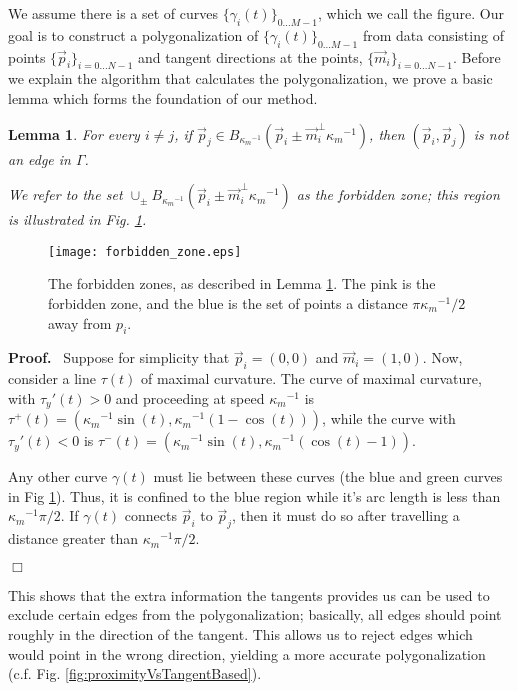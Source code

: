 \documentclass{article}
\newenvironment{proof}{
  \noindent\textbf{Proof.}\ }{\hspace*{\fill}
  \begin{math}\Box\end{math}\medskip}
\newtheorem{lemma}[cntr]{Lemma}
\numberwithin{cntr}{section}
\numberwithin{equation}{section}
\newcommand{\vp}[0]{{\vec{p}}}
\newcommand{\vm}[0]{{\vec{m}}}
\newcommand{\Oto}[1]{{0 \ldots #1-1}}
\newcommand{\OtoN}{{0 \ldots N-1}}
\newcommand{\pointData}{{ \{ \vp_{i} \}_{i=\OtoN} }}
\newcommand{\tanData}{{ \{ \vm_{i} \}_{i=\OtoN} }}
\newcommand{\curveSet}{{ \{ \gamma_i(t) \}_{\Oto{M}}}}
\newcommand{\poly}{{\Gamma}}
\newcommand{\ball}[2]{ { B_{#1}(#2) } }
\newcommand{\kmax}{{\kappa_{m}}}
\newcommand{\kmaxi}{{\kmax^{-1}}}
\begin{document}
We assume there is a set of curves $\curveSet$, which we call the figure. Our goal is to construct a polygonalization of $\curveSet$ from data consisting of points $\pointData$ and tangent directions at the points, $\tanData$. Before we explain the algorithm that calculates the polygonalization, we prove a basic lemma which forms the foundation of our method.
\begin{lemma}
  \label{lem:forbiddenZone}
  For every $i \neq j$, if $\vp_{j} \in \ball{\kmaxi}{\vp_{i} \pm \vm_{i}^{\perp} \kmaxi}$, then $(\vp_{i},\vp_{j})$ is not an edge in $\poly$.

  We refer to the set $\cup_{\pm} \ball{\kmaxi}{\vp_{i} \pm \vm_{i}^{\perp} \kmaxi}$ as the \emph{forbidden zone}; this region is illustrated in Fig. \ref{fig:forbiddenZone}.
\end{lemma}
\begin{figure}
\setlength{\unitlength}{0.240900pt}
\ifx\plotpoint\undefined\newsavebox{\plotpoint}\fi
\sbox{\plotpoint}{\rule[-0.200pt]{0.400pt}{0.400pt}}%
\texttt{[image: forbidden\_zone.eps]}

\caption{The forbidden zones, as described in Lemma \ref{lem:forbiddenZone}. The pink is the forbidden zone, and the blue is the set of points a distance $\pi \kmaxi/2$ away from $p_{i}$.}
\label{fig:forbiddenZone}
\end{figure}
\begin{proof}
  Suppose for simplicity that $\vp_{i}=(0,0)$ and $\vm_{i}=(1,0)$. Now, consider a line $\tau(t)$ of maximal curvature. The curve of maximal curvature, with $\tau_{y}'(t) > 0$ and proceeding at speed $\kmaxi$ is $\tau^{+}(t)=(\kmaxi \sin(t), \kmaxi (1-\cos(t)))$, while the curve with $\tau_{y}'(t) < 0$ is $\tau^{-}(t)=(\kmaxi \sin(t), \kmaxi (\cos(t)-1))$.

Any other curve $\gamma(t)$ must lie between these curves (the blue and green curves in Fig \ref{lem:forbiddenZone}). Thus, it is confined to the blue region while it's arc length is less than $\kmaxi \pi/2$. If $\gamma(t)$ connects $\vp_{i}$ to $\vp_{j}$, then it must do so after travelling a distance greater than $\kmaxi \pi/2$.

\end{proof}

This shows that the extra information the tangents provides us can be used to exclude certain edges from the polygonalization; basically, all edges should point roughly in the direction of the tangent. This allows us to reject edges which would point in the wrong direction, yielding a more accurate polygonalization (c.f. Fig. \ref{fig:proximityVsTangentBased}).
\end{document}
